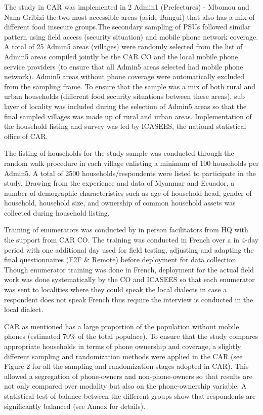 \documentclass[11pt,harvard]{article}
\begin{document}
The study in CAR was implemented in 2 Admin1 (Prefectures) - Mbomou and Nana-Gribizi the two most accessible areas (aside Bangui) that also has a mix of different food insecure groups.The secondary sampling of PSUs followed similar pattern using field access (security situation) and mobile phone network coverage. A total of 25 Admin5 areas (villages) were randomly selected from the list of Admin5 areas compiled jointly be the CAR CO and the local mobile phone service providers (to ensure that all Admin5 areas selected had mobile phone network). Admin5 areas without phone coverage were automatically excluded from the sampling frame. 
To ensure that the sample was a mix of both rural and urban households (different food security situations between these areas),  sub layer of locality was included during the selection of Admin5 areas so that the final sampled villages was made up of rural and urban areas. Implementation of the household listing and survey was led by ICASEES, the national statistical office of CAR.  

The listing of households for the study sample was conducted through the random walk procedure in each village enlisting a minimum of 100 households per Admin5. A total of 2500 households/respondents were listed to participate in the study. Drawing from the experience and data of Myanmar and Ecuador, a number of demographic characteristics such as age of household head, gender of household, household size, and ownership of common household assets was collected during household listing.
 
Training of enumerators was conducted by in person facilitators from HQ with the support from CAR CO. The training was conducted in French over a in 4-day period with one additional day used for field testing, adjusting and adapting the final questionnaires (F2F \& Remote) before deployment for data collection. Though enumerator training was done in French, deployment for the actual field work was done systematically by the CO and ICASEES so that each enumerator was sent to localities where they could speak the local dialects in case a respondent does not speak French thus require the interview is conducted in the local dialect.

CAR as mentioned has a large proportion of the population without mobile phones (estimated 70\% of the total populace). To ensure that the study compares appropriate households in terms of phone ownership and coverage, a slightly different sampling and randomization methods were applied in the CAR (see Figure 2 for all the sampling and randomization stages adopted in CAR). This allowed a segregation of phone-owners and non-phone-owners so that results are not only compared over modality but also on the phone-ownership variable. A statistical test of balance between the different groups show that respondents are significantly balanced (see Annex for details).
\end{document}
